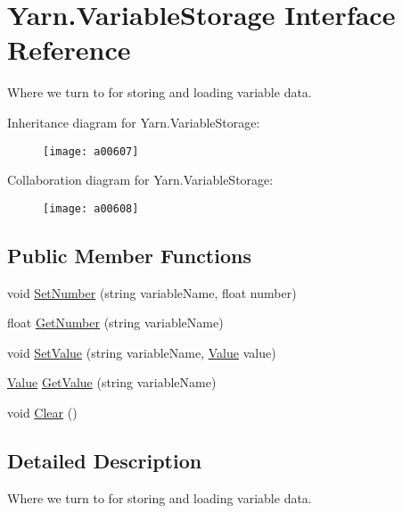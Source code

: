 \hypertarget{a00190}{\section{Yarn.\-Variable\-Storage Interface Reference}
\label{a00190}
}


Where we turn to for storing and loading variable data.  




Inheritance diagram for Yarn.\-Variable\-Storage\-:
\nopagebreak
\begin{figure}[H]
\begin{center}
\leavevmode
\texttt{[image: a00607]}
\end{center}
\end{figure}


Collaboration diagram for Yarn.\-Variable\-Storage\-:
\nopagebreak
\begin{figure}[H]
\begin{center}
\leavevmode
\texttt{[image: a00608]}
\end{center}
\end{figure}
\subsection*{Public Member Functions}
\begin{DoxyCompactItemize}
\item 
void \hyperlink{a00190_aa28c3694f985cf73489efc301b9d41dd}{Set\-Number} (string variable\-Name, float number)
\item 
float \hyperlink{a00190_a04b061c52d8ac814ce559da5286fbc71}{Get\-Number} (string variable\-Name)
\item 
void \hyperlink{a00190_aa90ff61224432c5ed3ce72199c55f440}{Set\-Value} (string variable\-Name, \hyperlink{a00187}{Value} value)
\item 
\hyperlink{a00187}{Value} \hyperlink{a00190_accab1fc5c8fc353dbfc53ca0f4029576}{Get\-Value} (string variable\-Name)
\item 
void \hyperlink{a00190_af98c1e41f351cb96e13f668ca2fd9d92}{Clear} ()
\end{DoxyCompactItemize}


\subsection{Detailed Description}
Where we turn to for storing and loading variable data. 

